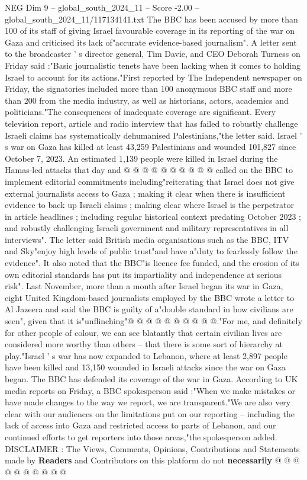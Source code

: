 \begin{textsample}{NEG Dim 9 – global\_south\_2024\_11 – Score -2.00 – global\_south\_2024\_11/117134141.txt}  \label{ex:f9_neg_307}
The BBC has been accused by more than 100 of its staff of giving Israel favourable coverage in its reporting of the war on Gaza and criticised its lack of"accurate evidence-based journalism".
A letter sent to the broadcaster ' s director general, Tim Davie, and CEO Deborah Turness on Friday said :"Basic journalistic tenets have been lacking when it comes to holding Israel to account for its actions."First reported by The Independent newspaper on Friday, the signatories included more than 100 anonymous BBC staff and more than 200 from the media industry, as well as historians, actors, academics and politicians."The consequences of inadequate coverage are significant.
Every television report, article and radio interview that has failed to robustly challenge Israeli claims has systematically dehumanised Palestinians,"the letter said.
Israel ' s war on Gaza has killed at least 43,259 Palestinians and wounded 101,827 since October 7, 2023.
An estimated 1,139 people were killed in Israel during the Hamas-led attacks that day and @ @ @ @ @ @ @ @ @ @ called on the BBC to implement editorial commitments including"reiterating that Israel does not give external journalists access to Gaza ; making it clear when there is insufficient evidence to back up Israeli claims ; making clear where Israel is the perpetrator in article headlines ; including regular historical context predating October 2023 ; and robustly challenging Israeli government and military representatives in all interviews".
The letter said British media organisations such as the BBC, ITV and Sky"enjoy high levels of public trust"and have a"duty to fearlessly follow the evidence".
It also noted that the BBC"is licence fee funded, and the erosion of its own editorial standards has put its impartiality and independence at serious risk".
Last November, more than a month after Israel began its war in Gaza, eight United Kingdom-based journalists employed by the BBC wrote a letter to Al Jazeera and said the BBC is guilty of a"double standard in how civilians are seen", given that it is"unflinching"@ @ @ @ @ @ @ @ @ @."For me, and definitely for other people of colour, we can see blatantly that certain civilian lives are considered more worthy than others -- that there is some sort of hierarchy at play."Israel ' s war has now expanded to Lebanon, where at least 2,897 people have been killed and 13,150 wounded in Israeli attacks since the war on Gaza began.
The BBC has defended its coverage of the war in Gaza.
According to UK media reports on Friday, a BBC spokesperson said :"When we make mistakes or have made changes to the way we report, we are transparent."We are also very clear with our audiences on the limitations put on our reporting -- including the lack of access into Gaza and restricted access to parts of Lebanon, and our continued efforts to get reporters into those areas,"the spokesperson added.
DISCLAIMER : The Views, Comments, Opinions, Contributions and Statements made by \textbf{Readers} and Contributors on this platform do not \textbf{necessarily} @ @ @ @ @ @ @ @ @ @

\end{textsample}
